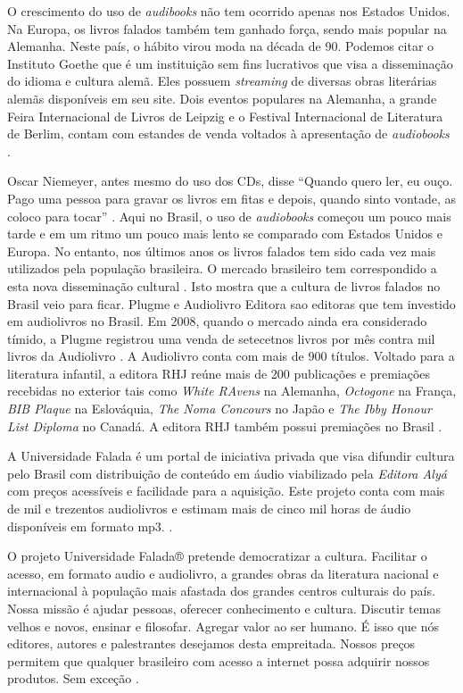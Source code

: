 O crescimento do uso de \textit{audibooks} não tem ocorrido apenas nos Estados Unidos. Na Europa, os livros falados também tem ganhado força, sendo mais popular na Alemanha. Neste país, o hábito virou moda na década de 90. Podemos citar o Instituto Goethe que é um instituição sem fins lucrativos que visa a disseminação do idioma e cultura alemã. Eles possuem \textit{streaming} de diversas obras literárias alemãs disponíveis em seu site. Dois eventos populares na Alemanha, a grande Feira Internacional de Livros de Leipzig e o Festival Internacional de Literatura de Berlim, contam com estandes de venda voltados à apresentação de \textit{audiobooks} \cite{dw}.

Oscar Niemeyer, antes mesmo do uso dos CDs, disse ``Quando quero ler, eu ouço. Pago uma pessoa para gravar os livros em fitas e depois, quando sinto vontade, as coloco para tocar'' \cite{audiobookinovacao}. Aqui no Brasil, o uso de \textit{audiobooks} começou um pouco mais tarde e em um ritmo um pouco mais lento se comparado com Estados Unidos e Europa. No entanto, nos últimos anos os livros falados tem sido cada vez mais utilizados pela população brasileira. O mercado brasileiro tem correspondido a esta nova disseminação cultural \cite{farias}. Isto mostra que a cultura de livros falados no Brasil veio para ficar. Plugme e Audiolivro Editora sao editoras que tem investido em audiolivros no Brasil. Em 2008, quando o mercado ainda era considerado tímido, a Plugme registrou uma venda de setecetnos livros por mês contra mil livros da Audiolivro \cite{audiobooksuporte}. A Audiolivro conta com mais de 900 títulos. Voltado para a literatura infantil, a editora RHJ reúne mais de 200 publicações e premiações recebidas no exterior tais como \textit{White RAvens} na Alemanha, \textit{Octogone} na França, \textit{BIB Plaque} na Eslováquia, \textit{The Noma Concours} no Japão e \textit{The Ibby Honour List Diploma} no Canadá. A editora RHJ também possui premiações no Brasil \cite{rhj}.

A Universidade Falada é um portal de iniciativa privada que visa difundir cultura pelo Brasil com distribuição de conteúdo em áudio viabilizado pela \textit{Editora Alyá} com preços acessíveis e facilidade para a aquisição. Este projeto conta com mais de mil e trezentos audiolivros e estimam mais de cinco mil horas de áudio disponíveis em formato mp3. \cite{universidadefalada}.

\begin{citacao}
O projeto Universidade Falada® pretende democratizar a cultura. Facilitar o acesso, em formato audio e audiolivro, a grandes obras da literatura nacional e internacional à população mais afastada dos grandes centros culturais do país. Nossa missão é ajudar pessoas, oferecer conhecimento e cultura. Discutir temas velhos e novos, ensinar e filosofar. Agregar valor ao ser humano. É isso que nós editores, autores e palestrantes desejamos desta empreitada. Nossos preços permitem que qualquer brasileiro com acesso a internet possa adquirir nossos produtos. Sem exceção \cite{universidadefalada}.
\end{citacao}

